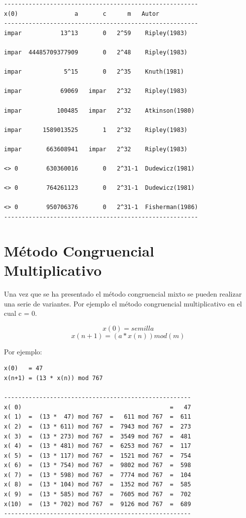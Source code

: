 \begin{verbatim}
-------------------------------------------------------
x(0)                a       c      m   Autor
-------------------------------------------------------
impar           13^13       0   2^59    Ripley(1983)
                              
impar  44485709377909       0   2^48    Ripley(1983)
                              
impar            5^15       0   2^35    Knuth(1981)
                              
impar           69069   impar   2^32    Ripley(1983)
                              
impar          100485   impar   2^32    Atkinson(1980)
                              
impar      1589013525       1   2^32    Ripley(1983)
                              
impar       663608941   impar   2^32    Ripley(1983)
                              
<> 0        630360016       0   2^31-1  Dudewicz(1981)
                              
<> 0        764261123       0   2^31-1  Dudewicz(1981)
                              
<> 0        950706376       0   2^31-1  Fisherman(1986)
-------------------------------------------------------
\end{verbatim}



\section{Método Congruencial Multiplicativo}

Una vez que se ha presentado el método congruencial mixto se pueden realizar una serie de variantes. Por ejemplo el método congruencial multiplicativo en el cual c = 0.

$$x(0)   = semilla$$
$$x(n+1) = (a * x(n)) mod (m)$$


Por ejemplo:
\begin{verbatim}
x(0)   = 47
x(n+1) = (13 * x(n)) mod 767

-----------------------------------------------------
x( 0)                                          =   47
x( 1)  =  (13 *  47) mod 767  =   611 mod 767  =  611
x( 2)  =  (13 * 611) mod 767  =  7943 mod 767  =  273
x( 3)  =  (13 * 273) mod 767  =  3549 mod 767  =  481
x( 4)  =  (13 * 481) mod 767  =  6253 mod 767  =  117
x( 5)  =  (13 * 117) mod 767  =  1521 mod 767  =  754
x( 6)  =  (13 * 754) mod 767  =  9802 mod 767  =  598
x( 7)  =  (13 * 598) mod 767  =  7774 mod 767  =  104
x( 8)  =  (13 * 104) mod 767  =  1352 mod 767  =  585
x( 9)  =  (13 * 585) mod 767  =  7605 mod 767  =  702
x(10)  =  (13 * 702) mod 767  =  9126 mod 767  =  689
-----------------------------------------------------
\end{verbatim}



